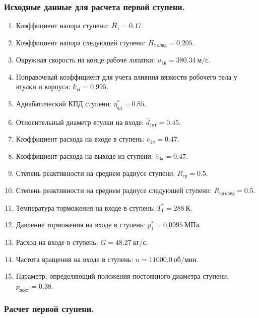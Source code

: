 \documentclass[a4paper,12pt]{article}
\begin{document}
    
    \subsubsection{Исходные данные для расчета первой ступени.}
%    
    \begin{enumerate}

        \item Коэффициент напора ступени: $\bar{H}_{т} = 0.17$.
        \item Коэффициент напора следующей ступени: $ \bar{H}_{т\ след} = 0.205$.
        \item Окружная скорость на конце рабоче лопатки: $ u_{1к} = 380.34\ м/с $.
        \item Поправочный коэффициент для учета влияния вязкости робочего тела у втулки и корпуса: $ k_H = 0.995 $.
        \item Адиабатический КПД ступени: $ \eta_{ад}^* = 0.85 $.
        \item Относительный диаметр втулки на входе: $ \bar{d}_{1вт} = 0.45 $.
        \item Коэффициент расхода на входе в ступень: $ \bar{c}_{1a} = 0.47 $.
        \item Коэффициент расхода на выходе из ступени: $ \bar{c}_{3a} = 0.47 $.
        \item Степень реактивности на среднем радиусе ступени: $ R_{ср} = 0.5 $.
        \item Степень реактивности на среднем радиусе следующей ступени: $ R_{ср\ след} = 0.5 $.
        \item Температура торможения на входе в ступень: $ T_1^* = 288\ К $.
        \item Давление торможения на входе в ступень: $ p_1^* = 0.0995\ МПа $.
        \item Расход на входе в ступень: $ G = 48.27\ кг/с $.
        \item Частота вращения на входе в ступень: $ n = 11000.0\ об/мин $.
        \item Параметр, определяющий положения постоянного диаметра ступени: $ p_{пост} = 0.38 $.


    \end{enumerate}
    
    \subsubsection{Расчет первой ступени.}
%    

    
\end{document}
